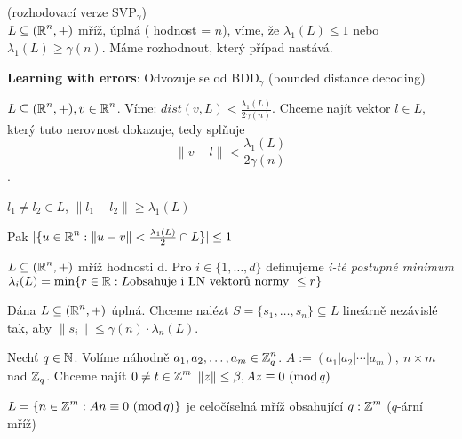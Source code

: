 \begin{definition}
(rozhodovací verze SVP$_\gamma$)\\
$L \subseteq (\operatorname{\mathbb{R}} ^n, +)$ mříž, úplná ( hodnost = $n$), víme, že $\lambda_1(L) \leq 1 $ nebo $\lambda_1(L) \geq \gamma(n)$. Máme rozhodnout, který případ nastává.
\end{definition}

\textbf{Learning with errors}: Odvozuje se od BDD$_\gamma$ (bounded distance decoding) 

\begin{definition}
$L \subseteq (\operatorname{\mathbb{R}}^n, +), v\in \operatorname{\mathbb{R}}^n$. Víme: $dist(v,L) < \frac{\lambda_1(L)}{2\gamma(n)}$. Chceme najít vektor $l\in L$, který tuto nerovnost dokazuje, tedy splňuje $$\|v-l\| < \frac{\lambda_1(L)}{2 \gamma(n)}$$.
\end{definition}

\begin{note}
$l_1 \neq l_2 \in L$, $\|l_1-l_2\| \geq \lambda_1(L)$

Pak  $ |\{u \in \operatorname{\mathbb{R}}^n : \|u-v\|<\frac{\lambda_1(L)}{2} \cap L\}| \leq 1$
\end{note}

\begin{definition}
$L \subseteq (\operatorname{\mathbb{R}}^n, +)$ mříž hodnosti d. Pro $i \in \{1, \dots, d\}$ definujeme \emph{i-té postupné minimum} $\lambda_i(L) = \min\{r \in \operatorname{\mathbb{R}}: L \text{obsahuje i LN vektorů normy } \leq r\}$
\end{definition}

\begin{definition}
Dána $L \subseteq (\operatorname{\mathbb{R}}^n, +) $ úplná. Chceme nalézt $S = \{s_1, \ldots, s_n\} \subseteq L$ lineárně nezávislé tak, aby $\|s_i\|\leq\gamma(n)\cdot\lambda_n(L)$.
\end{definition}

\begin{definition}
Nechť $q \in \operatorname{\mathbb{N}}$. Volíme náhodně $a_1, a_2, \dots, a_m \in \operatorname{\mathbb{Z}}^n_q$. $A:= (a_1|a_2|\cdots|a_m),\ n \times m$ nad $\operatorname{\mathbb{Z}}_q$. Chceme najít $0 \neq t\in\Z^m \  \|z\|\leq\beta, Az\equiv0\ (\modulo q)$
\end{definition}

\begin{note}
$L = \{n \in \operatorname{\mathbb{Z}}^m: An \equiv 0\ (\operatorname{mod} q)\}$ je celočíselná mříž obsahující $q:\operatorname{\mathbb{Z}}^m$ ($q$-ární mříž)
\end{note}

